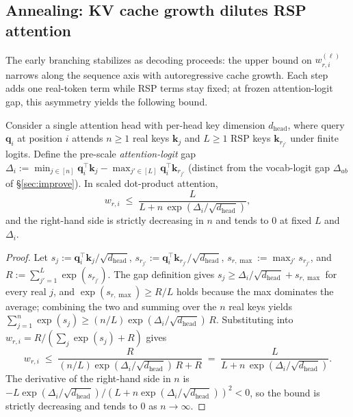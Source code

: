 \subsection{Annealing: KV cache growth dilutes RSP attention}\label{sec:converge}

The early branching stabilizes as decoding proceeds: the upper bound on $w_{r,i}^{(\ell)}$ narrows along the sequence axis with autoregressive cache growth. Each step adds one real-token term while RSP terms stay fixed; at frozen attention-logit gap, this asymmetry yields the following bound.

\begin{theorem}\label{thm:decay}
Consider a single attention head with per-head key dimension $d_{\text{head}}$, where query $\mathbf{q}_i$ at position $i$ attends $n\ge1$ real keys $\mathbf{k}_j$ and $L\ge1$ RSP keys $\mathbf{k}_{r_{j'}}$ under finite logits. Define the pre-scale \emph{attention-logit} gap $\Delta_i := \min_{j\in[n]}\mathbf{q}_i^\top\mathbf{k}_j - \max_{j'\in[L]}\mathbf{q}_i^\top\mathbf{k}_{r_{j'}}$ (distinct from the vocab-logit gap $\Delta_{ab}$ of \S\ref{sec:improve}). In scaled dot-product attention,
\[
w_{r,i} \;\le\; \frac{L}{L + n\,\exp(\Delta_i/\sqrt{d_{\text{head}}})},
\]
and the right-hand side is strictly decreasing in $n$ and tends to $0$ at fixed $L$ and $\Delta_i$.
\end{theorem}

\begin{proof}
Let $s_j := \mathbf{q}_i^\top\mathbf{k}_j/\sqrt{d_{\text{head}}}$, $s_{r_{j'}} := \mathbf{q}_i^\top\mathbf{k}_{r_{j'}}/\sqrt{d_{\text{head}}}$, $s_{r,\max} := \max_{j'} s_{r_{j'}}$, and $R := \sum_{j'=1}^L \exp(s_{r_{j'}})$. The gap definition gives $s_j \ge \Delta_i/\sqrt{d_{\text{head}}} + s_{r,\max}$ for every real $j$, and $\exp(s_{r,\max}) \ge R/L$ holds because the max dominates the average; combining the two and summing over the $n$ real keys yields $\sum_{j=1}^n \exp(s_j) \ge (n/L)\exp(\Delta_i/\sqrt{d_{\text{head}}})\,R$. Substituting into $w_{r,i} = R/(\sum_j\exp(s_j) + R)$ gives
\[
w_{r,i}
\;\le\;
\frac{R}{(n/L)\exp(\Delta_i/\sqrt{d_{\text{head}}})\,R + R}
\;=\;
\frac{L}{L + n\,\exp(\Delta_i/\sqrt{d_{\text{head}}})}.
\]
The derivative of the right-hand side in $n$ is $-L\exp(\Delta_i/\sqrt{d_{\text{head}}})/(L + n\exp(\Delta_i/\sqrt{d_{\text{head}}}))^2 < 0$, so the bound is strictly decreasing and tends to $0$ as $n\to\infty$.
\end{proof}

